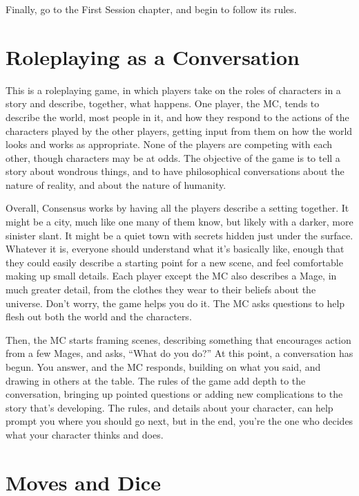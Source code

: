 \documentclass[
  oneside,
  statementpaper,
  9pt]{memoir}
\begin{document}
Finally, go to the First Session chapter, and begin to follow its rules.

\hypertarget{roleplaying-as-a-conversation}{%
\section{Roleplaying as a
Conversation}\label{roleplaying-as-a-conversation}}

This is a roleplaying game, in which players take on the roles of
characters in a story and describe, together, what happens. One player,
the MC, tends to describe the world, most people in it, and how they
respond to the actions of the characters played by the other players,
getting input from them on how the world looks and works as appropriate.
None of the players are competing with each other, though characters may
be at odds. The objective of the game is to tell a story about wondrous
things, and to have philosophical conversations about the nature of
reality, and about the nature of humanity.

Overall, Consensus works by having all the players describe a setting
together. It might be a city, much like one many of them know, but
likely with a darker, more sinister slant. It might be a quiet town with
secrets hidden just under the surface. Whatever it is, everyone should
understand what it's basically like, enough that they could easily
describe a starting point for a new scene, and feel comfortable making
up small details. Each player except the MC also describes a Mage, in
much greater detail, from the clothes they wear to their beliefs about
the universe. Don't worry, the game helps you do it. The MC asks
questions to help flesh out both the world and the characters.

Then, the MC starts framing scenes, describing something that encourages
action from a few Mages, and asks, ``What do you do?'' At this point, a
conversation has begun. You answer, and the MC responds, building on
what you said, and drawing in others at the table. The rules of the game
add depth to the conversation, bringing up pointed questions or adding
new complications to the story that's developing. The rules, and details
about your character, can help prompt you where you should go next, but
in the end, you're the one who decides what your character thinks and
does.

\hypertarget{moves-and-dice}{%
\section{Moves and Dice}\label{moves-and-dice}}
\end{document}
